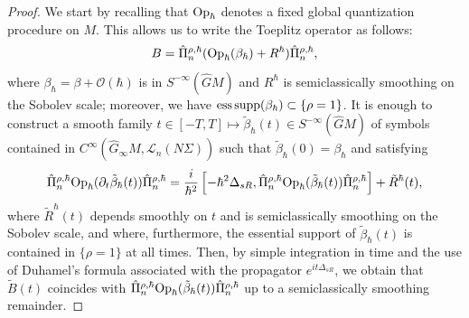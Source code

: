 \documentclass[12pt,a4paper]{amsart}
\theoremstyle{plain}
\theoremstyle{definition}
\theoremstyle{remark}
\numberwithin{equation}{section}
\theoremstyle{definition}
\def \Op{{\rm Op}}
\def \O{\mathscr{O}}
\def \Ghat{\widehat{G}}
\numberwithin{equation}{section}
\begin{document}
\begin{proof}
    We start by recalling that $\Op_\hbar$ denotes a fixed global quantization procedure on $M$. This allows us to write the Toeplitz operator as follows:
    \begin{equation*}
        B = \hat{\Pi}_n^{\rho,\hbar}(\Op_\hbar(\beta_\hbar) + R^\hbar)\hat{\Pi}_n^{\rho,\hbar},
    \end{equation*}
    where $\beta_\hbar = \beta + \O(\hbar)$ is in $S^{-\infty}(\Ghat M)$ and $R^\hbar$ is semiclassically smoothing on the Sobolev scale; moreover, we have ${\rm ess\,supp}(\beta_\hbar) \subset\{\rho = 1\}$.
    It is enough to construct a smooth family $t\in[-T,T]\mapsto \tilde{\beta}_\hbar(t)\in S^{-\infty}(\Ghat M)$ of symbols contained in $C^\infty(\Ghat_\infty M, \mathscr{L}_n(N\Sigma))$ such that $\tilde{\beta}_\hbar(0) = \beta_\hbar$ and satisfying
    \begin{equation}
        \label{eq:egorovnecessaryeq}
        \hat{\Pi}_n^{\rho,\hbar} \Op_\hbar(\partial_t\tilde{\beta}_\hbar(t))\hat{\Pi}_n^{\rho,\hbar} = \frac{i}{\hbar^2}\left[-\hbar^2\Delta_{sR},\hat{\Pi}_n^{\rho,\hbar} \Op_\hbar(\tilde{\beta}_\hbar(t))\hat{\Pi}_n^{\rho,\hbar}\right] + \tilde{R}^\hbar(t),
    \end{equation}
    where $\tilde{R}^\hbar(t)$ depends smoothly on $t$ and is semiclassically smoothing on the Sobolev scale, and where, furthermore, the essential support of $\tilde{\beta}_\hbar(t)$ is contained in $\{\rho =1\}$ at all times. Then, by simple integration in time and the use of Duhamel's formula associated with the propagator $e^{it\Delta_{sR}}$, we obtain that $\tilde{B}(t)$ coincides with $\hat{\Pi}_n^{\rho,\hbar} \Op_\hbar(\tilde{\beta}_\hbar(t))\hat{\Pi}_n^{\rho,\hbar}$ up to a semiclassically smoothing remainder.


\end{proof}
\end{document}
